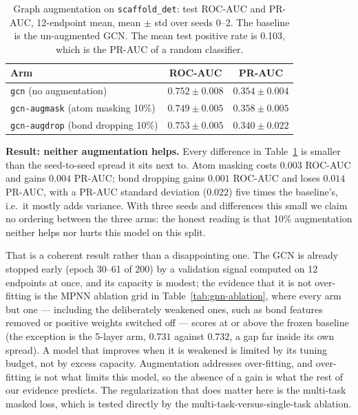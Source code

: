 \begin{table}[t]
\centering
\caption{Graph augmentation on \texttt{scaffold\_det}: test ROC-AUC and PR-AUC, 12-endpoint
mean, mean $\pm$ std over seeds 0--2. The baseline is the un-augmented GCN. The mean test
positive rate is 0.103, which is the PR-AUC of a random classifier.}
\label{tab:augmentation}
\begin{tabular}{lcc}
\hline
Arm & ROC-AUC & PR-AUC \\
\hline
\texttt{gcn} (no augmentation) & $0.752 \pm 0.008$ & $0.354 \pm 0.004$ \\
\texttt{gcn-augmask} (atom masking 10\%) & $0.749 \pm 0.005$ & $0.358 \pm 0.005$ \\
\texttt{gcn-augdrop} (bond dropping 10\%) & $0.753 \pm 0.005$ & $0.340 \pm 0.022$ \\
\hline
\end{tabular}
\end{table}

\textbf{Result: neither augmentation helps.} Every difference in Table~\ref{tab:augmentation} is
smaller than the seed-to-seed spread it sits next to. Atom masking costs $0.003$ ROC-AUC and
gains $0.004$ PR-AUC; bond dropping gains $0.001$ ROC-AUC and loses $0.014$ PR-AUC, with a
PR-AUC standard deviation ($0.022$) five times the baseline's, i.e.\ it mostly adds variance.
With three seeds and differences this small we claim no ordering between the three arms: the
honest reading is that 10\% augmentation neither helps nor hurts this model on this split.

That is a coherent result rather than a disappointing one. The GCN is already stopped early
(epoch 30--61 of 200) by a validation signal computed on 12 endpoints at once, and its capacity
is modest; the evidence that it is not over-fitting is the MPNN ablation grid in
Table~\ref{tab:gnn-ablation}, where every arm but one --- including the deliberately weakened
ones, such as bond features removed or positive weights switched off --- scores at or above the
frozen baseline (the exception is the 5-layer arm, $0.731$ against $0.732$, a gap far inside its
own spread). A model that improves when it is weakened is limited by its tuning budget, not by
excess capacity. Augmentation addresses over-fitting, and over-fitting is not what limits this
model, so the absence of a gain is what the rest of our evidence predicts. The regularization
that does matter here is the multi-task masked loss, which is tested directly by the
multi-task-versus-single-task ablation.
